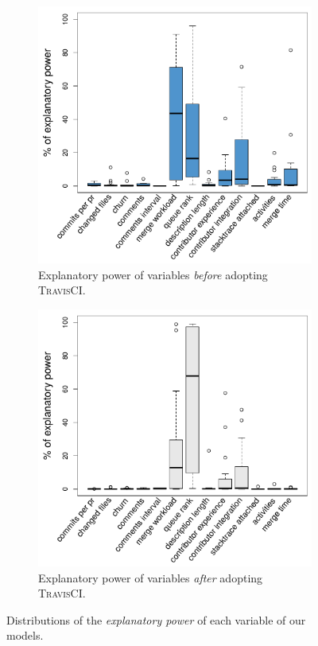\begin{figure}
	\begin{subfigure}{0.4\textwidth}
		\centering
		\includegraphics[width=\linewidth,keepaspectratio]{variable_importance_before_adopting_ci.pdf}
		\caption{Explanatory power of variables \textit{before} adopting \textsc{TravisCI}.}
		\label{img:variables_importance_before_ci}
	\end{subfigure}\hfill
	\begin{subfigure}{0.4\textwidth}
		\centering
		\includegraphics[width=\linewidth,keepaspectratio]{variable_importance_using_ci.pdf}
		\caption{Explanatory power of variables \textit{after} adopting \textsc{TravisCI}.}
		\label{img:variables_importance_using_ci}
	\end{subfigure}\hfill
	\caption{Distributions of the \textit{explanatory power} of each variable of our models.}
	\label{img:variables_importance}
\end{figure}

